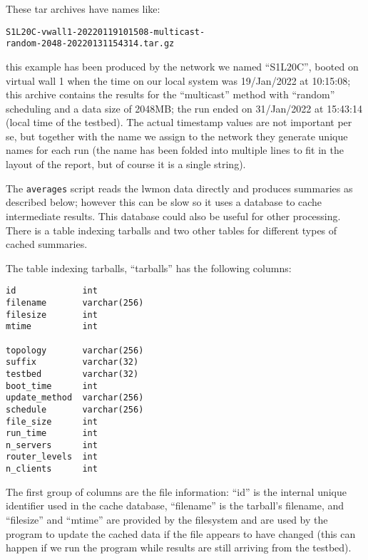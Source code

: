 \documentclass[a4paper,11pt,twocolumn]{article}
\begin{document}
These tar archives have names like:

\begin{small}
\begin{verbatim}
S1L20C-vwall1-20220119101508-multicast-
random-2048-20220131154314.tar.gz
\end{verbatim}
\end{small}

\noindent
this example has been produced by the network we named ``S1L20C'', booted
on virtual wall 1 when the time on our local system was 19/Jan/2022
at 10:15:08; this archive contains the results for the ``multicast''
method with ``random'' scheduling and a data size of 2048MB; the run
ended on 31/Jan/2022 at 15:43:14 (local time of the testbed).  The actual
timestamp values are not important per se, but together with the name we
assign to the network they generate unique names for each run (the name
has been folded into multiple lines to fit in the layout of the report,
but of course it is a single string).

The {\tt averages} script reads the lwmon data directly and produces
summaries as described below; however this can be slow so it uses a
database to cache intermediate results.  This database could also
be useful for other processing. There is a table indexing tarballs
and two other tables for different types of cached summaries.

The table indexing tarballs, ``tarballs'' has the following columns:

\begin{small}
\begin{verbatim}
id             int
filename       varchar(256)
filesize       int
mtime          int

topology       varchar(256)
suffix         varchar(32)
testbed        varchar(32)
boot_time      int
update_method  varchar(256)
schedule       varchar(256)
file_size      int
run_time       int
n_servers      int
router_levels  int
n_clients      int
\end{verbatim}
\end{small}

The first group of columns are the file information: ``id'' is the
internal unique identifier used in the cache database, ``filename''
is the tarball's filename, and ``filesize'' and ``mtime'' are provided
by the filesystem and are used by the program to update the cached data
if the file appears to have changed (this can happen if we run the
program while results are still arriving from the testbed).
\end{document}
